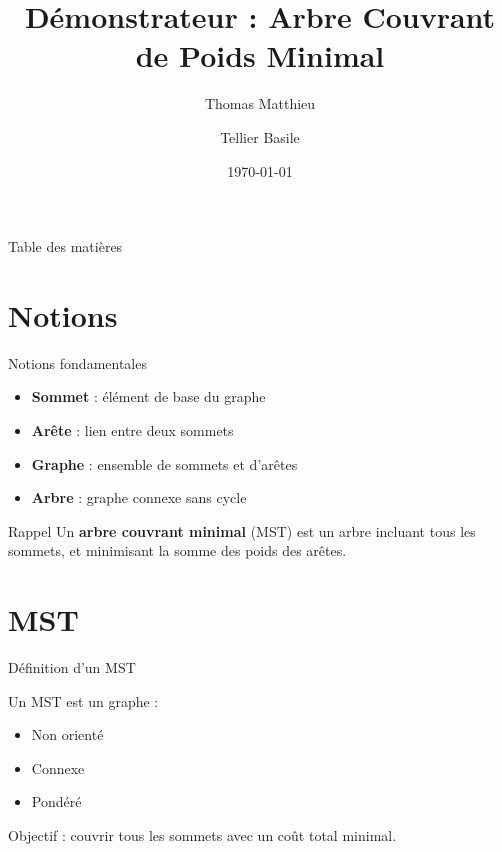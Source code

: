 \documentclass[10pt]{beamer}
\title{Démonstrateur : Arbre Couvrant de Poids Minimal}
\author{Thomas Matthieu \and Tellier Basile}
\date{\today}
\begin{document}
\begin{frame}
\titlepage
\end{frame}

\begin{frame}{Table des matières}
\tableofcontents
\end{frame}

\section{Notions}

\begin{frame}{Notions fondamentales}

\begin{itemize}
    \item \textbf{Sommet} : élément de base du graphe
    \item \textbf{Arête} : lien entre deux sommets
    \item \textbf{Graphe} : ensemble de sommets et d’arêtes
    \item \textbf{Arbre} : graphe connexe sans cycle
\end{itemize}

\vspace{0.5cm}

\begin{block}{Rappel}
Un \textbf{arbre couvrant minimal} (MST) est un arbre incluant tous les sommets, et minimisant la somme des poids des arêtes.
\end{block}

\end{frame}

\section{MST}

\begin{frame}{Définition d’un MST}

Un MST est un graphe :
\begin{itemize}
    \item Non orienté
    \item Connexe
    \item Pondéré
\end{itemize}

\vspace{0.5cm}

\alert{Objectif : couvrir tous les sommets avec un coût total minimal.}

\end{frame}
\end{document}
